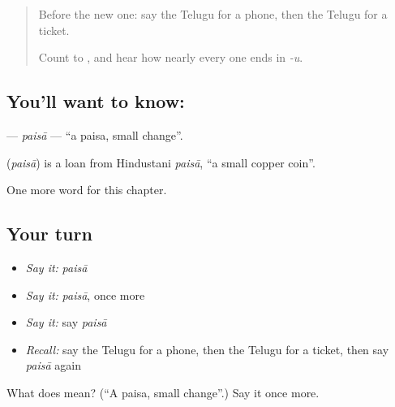 \label{lesson:TE-C130-paisa}



\begin{quote}
Before the new one: say the Telugu for a phone, then the Telugu for a ticket.

Count \textbf{} to \textbf{}, and hear how nearly every one ends in \emph{-u}.
\end{quote}

\subsection*{You'll want to know: }
\textbf{} — \emph{paisā} — \textquotedblleft{}a paisa, small change\textquotedblright{}.

\begin{cousinweb}
\textbf{} (\emph{paisā}) is a loan from Hindustani \emph{paisā}, \textquotedblleft{}a small copper coin\textquotedblright{}.
\end{cousinweb}

\begin{grammarlens}[title={What you've built}]
One more word for this chapter.
\end{grammarlens}

\subsection*{Your turn}
\begin{itemize}
\raggedright
  \item \emph{Say it:} \emph{paisā}
  \item \emph{Say it:} \emph{paisā}, once more
  \item \emph{Say it:} say \emph{paisā}
  \item \emph{Recall:} say the Telugu for a phone, then the Telugu for a ticket, then say \emph{paisā} again
\end{itemize}

\begin{tcolorbox}[breakable,colback=teal!4,colframe=teal!35!black,title={Before you move on}]
What does  mean? (\textquotedblleft{}A paisa, small change\textquotedblright{}.) Say it once more.
\end{tcolorbox}

